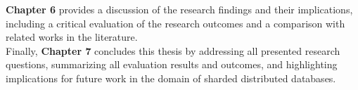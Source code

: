 \noindent \textbf{Chapter 6} provides a discussion of the research findings and their implications, including a critical evaluation of the research outcomes and a comparison with related works in the literature. \\

\noindent Finally, \textbf{Chapter 7} concludes this thesis by addressing all presented research questions, summarizing all evaluation results and outcomes, and highlighting implications for future work in the domain of sharded distributed databases.

